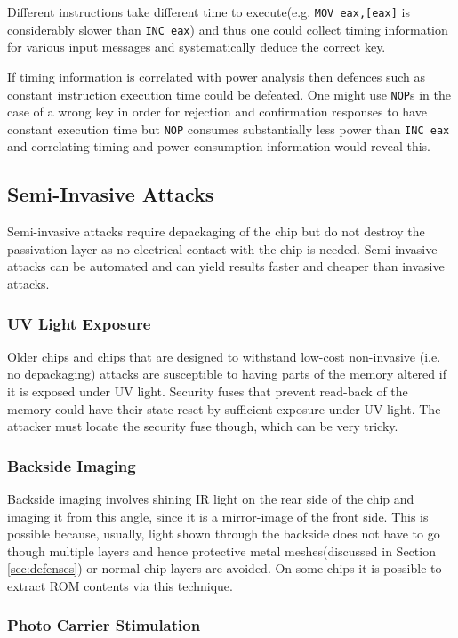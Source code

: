 	Different instructions take different time to execute(e.g. \texttt{MOV eax,[eax]} is considerably slower than \texttt{INC eax}) and thus one could collect timing information for various input messages and systematically deduce the correct key. 
	
	If timing information is correlated with power analysis then defences such as constant instruction execution time could be defeated. One might use \texttt{NOP}s in the case of a wrong key in order for rejection and confirmation responses to have constant execution time but \texttt{NOP} consumes substantially less power than \texttt{INC eax} and correlating timing and power consumption information would reveal this.

	\subsection{Semi-Invasive Attacks}
	Semi-invasive attacks require depackaging of the chip but do not destroy the passivation layer as no electrical contact with the chip is needed. Semi-invasive attacks can be automated and can yield results faster and cheaper than invasive attacks.
	
	\subsubsection{UV Light Exposure}
	Older chips and chips that are designed to withstand low-cost non-invasive (i.e. no depackaging) attacks are susceptible to having parts of the memory altered if it is exposed under UV light. Security fuses that prevent read-back of the memory could have their state reset by sufficient exposure under UV light. The attacker must locate the security fuse though, which can be very tricky. 

	\subsubsection{Backside Imaging}
	Backside imaging involves shining IR light on the rear side of the chip and imaging it from this angle, since it is a mirror-image of the front side. This is possible because, usually, light shown through the backside does not have to go though multiple layers and hence protective metal meshes(discussed in Section \ref{sec:defenses}) or normal chip layers are avoided. On some chips it is possible to extract ROM contents via this technique.
	
	\subsubsection{Photo Carrier Stimulation}

